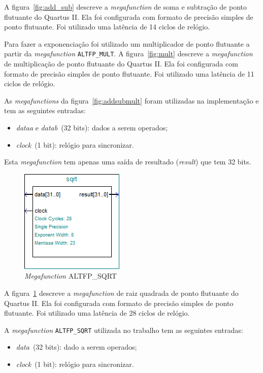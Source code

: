 \documentclass[12pt]{article}
\begin{document}
A figura~\ref{fig:add_sub} descreve a \textit{megafunction} de soma e subtração de
ponto flutuante do Quartus II. Ela foi configurada com formato de precisão
simples de ponto flutuante. Foi utilizado uma latência de 14 ciclos de relógio.

Para fazer a exponenciação foi utilizado um multiplicador de ponto flutuante a
partir da \textit{megafunction} \verb|ALTFP_MULT|. 
A figura~\ref{fig:mult} descreve a \textit{megafunction} de multiplicação de
ponto flutuante do Quartus II. Ela foi configurada com formato de precisão
simples de ponto flutuante. Foi utilizado uma latência de 11 ciclos de relógio.


As \textit{megafunctions} da figura~\ref{fig:addsubmult} foram utilizadas na 
implementação e tem as seguintes entradas:
\begin{itemize}
\item \textit{dataa} e \textit{datab}~(32 bits): dados a serem operados;
\item \textit{clock}~(1 bit): relógio para sincronizar.
\end{itemize}

Esta \textit{megafunction} tem apenas uma saída de resultado (\textit{result})
que tem 32 bits.

\begin{figure}[h]
\centering
\includegraphics[width=.3\textwidth]{../apresentacao/sqrt}
\caption{\textit{Megafunction} ALTFP\_SQRT}
\label{fig:sqrt}
\end{figure}

A figura~\ref{fig:sqrt} descreve a \textit{megafunction} de raiz quadrada de
ponto flutuante do Quartus II. Ela foi configurada com formato de precisão
simples de ponto flutuante. Foi utilizado uma latência de 28 ciclos de relógio.

A \textit{megafunction} \verb|ALTFP_SQRT| utilizada no trabalho tem as
seguintes entradas:
\begin{itemize}
\item \textit{data}~(32 bits): dado a serem operados;
\item \textit{clock}~(1 bit): relógio para sincronizar.
\end{itemize}
\end{document}
